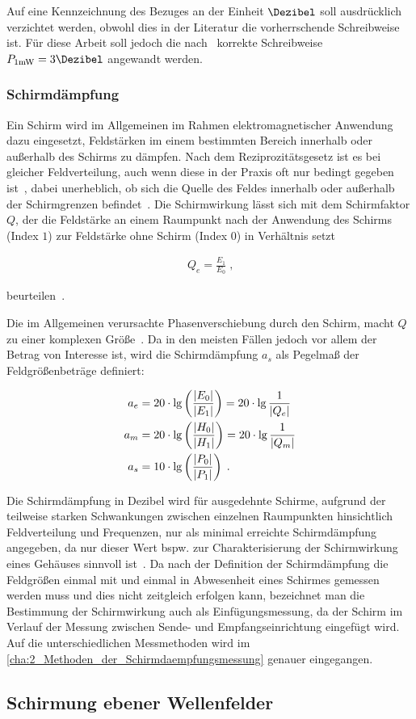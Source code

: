 Auf eine Kennzeichnung des Bezuges an der Einheit $\si{\Dezibel}$ soll ausdrücklich verzichtet werden, obwohl dies in der Literatur die vorherrschende Schreibweise ist. Für diese Arbeit soll jedoch die nach~\cite{IEC60027-3} korrekte Schreibweise $P_{1 \si{\milli\watt}} = 3 \si{\Dezibel}$ angewandt werden. 


\subsubsection{Schirmdämpfung}

Ein Schirm wird im Allgemeinen im Rahmen elektromagnetischer Anwendung dazu eingesetzt, Feldstärken im einem bestimmten Bereich innerhalb oder außerhalb des Schirms zu dämpfen. Nach dem Reziprozitätsgesetz ist es bei gleicher Feldverteilung, auch wenn diese in der Praxis oft nur bedingt gegeben ist~\cite{EMV-gerechtes_Geraetedesign}, dabei unerheblich, ob sich die Quelle des Feldes innerhalb oder außerhalb der Schirmgrenzen befindet~\cite{EM_Schirmung}. Die Schirmwirkung lässt sich mit dem Schirmfaktor $Q$, der die Feldstärke an einem Raumpunkt nach der Anwendung des Schirms (Index \glqq$1$\grqq) zur Feldstärke ohne Schirm (Index \glqq$0$\grqq) in Verhältnis setzt

\begin{align}
    Q_e = \frac{E_1}{E_0} \; \text{,}
\end{align}

beurteilen~\cite{EM_Schirmung}.
\par
\vspace{\linespace}
Die im Allgemeinen verursachte Phasenverschiebung durch den Schirm, macht $Q$ zu einer komplexen Größe~\cite{EM_Schirmung}. Da in den meisten Fällen jedoch vor allem der Betrag von Interesse ist, wird die Schirmdämpfung $a_s$ als Pegelmaß der Feldgrößenbeträge definiert:

\begin{align}
    a_e &= 20 \cdot \lg \left(\frac{\lvert E_0\rvert}{\lvert E_1\rvert}\right) = 20 \cdot \lg \frac{1}{\lvert Q_e\rvert} \\
    a_m &= 20 \cdot \lg \left(\frac{\lvert H_0\rvert}{\lvert H_1\rvert}\right) = 20 \cdot \lg \frac{1}{\lvert Q_m\rvert} \\
    a_s &= 10 \cdot \lg \left(\frac{\lvert P_0\rvert}{\lvert P_1\rvert}\right) \; \text{.}
\end{align}

Die Schirmdämpfung in Dezibel wird für ausgedehnte Schirme, aufgrund der teilweise starken Schwankungen zwischen einzelnen Raumpunkten hinsichtlich Feldverteilung und Frequenzen, nur als minimal erreichte Schirmdämpfung angegeben, da nur dieser Wert bspw. zur Charakterisierung der Schirmwirkung eines Gehäuses sinnvoll ist~\cite{EM_Schirmung}. Da nach der Definition der Schirmdämpfung die Feldgrößen einmal mit und einmal in Abwesenheit eines Schirmes gemessen werden muss und dies nicht zeitgleich erfolgen kann, bezeichnet man die Bestimmung der Schirmwirkung auch als Einfügungsmessung, da der Schirm im Verlauf der Messung zwischen Sende- und Empfangseinrichtung eingefügt wird. Auf die unterschiedlichen Messmethoden wird im \Abschnitt\ref{cha:2_Methoden_der_Schirmdaempfungsmessung} genauer eingegangen.


\subsection{Schirmung ebener Wellenfelder}

